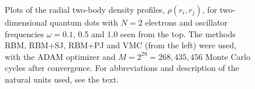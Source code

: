 \begin{landscape}
\begin{figure}
		\hspace{0.1cm}
		
		\caption{Plots of the radial two-body density profiles, $\rho(r_i, r_j)$, for two-dimensional quantum dots with $N=2$ electrons and oscillator frequencies $\omega=0.1$, 0.5 and 1.0 seen from the top. The methods RBM, RBM+SJ, RBM+PJ and VMC (from the left) were used, with the ADAM optimizer and $M=2^{28}=268,435,456$ Monte Carlo cycles after convergence. For  abbreviations and description of the natural units used, see the text.}%
		\label{fig:TB_interaction_2P}
	\end{figure}
\end{landscape}
